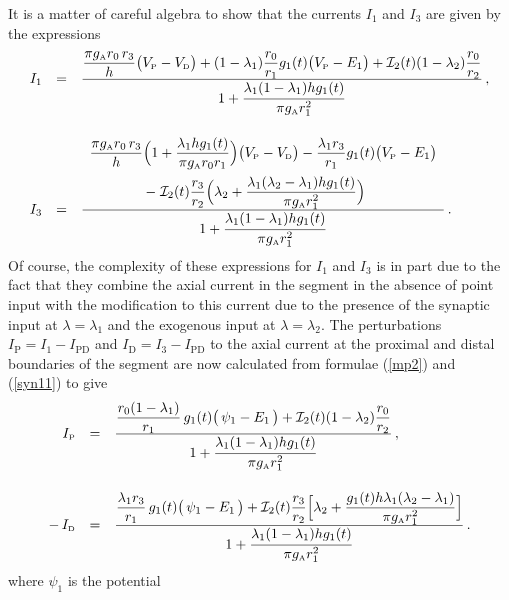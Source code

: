 It is a matter of careful algebra to show that the currents $I_1$
and $I_3$ are given by the expressions
\begin{equation}\label{syn11}
\begin{array}{rcl}
I_1 & = & \frac{\displaystyle\frac{\pi g_{\mbox{\tiny A}}r_0\,r_3}{h}
\big(V_{\mbox{\tiny P}}-V_{\mbox{\tiny D}}\big)
+(1-\lambda_1)\frac{r_0}{r_1}g_1(t)\big(V_{\mbox{\tiny P}}-E_1\big)
+\mathcal{I}_2(t)(1-\lambda_2)\frac{r_0}{r_2}}{\displaystyle1+
\frac{\lambda_1(1-\lambda_1)hg_1(t)\strut}{\pi
g_{\mbox{\tiny A}}r_1^2}}\,,\\[35pt]
I_3 & = & \frac{\begin{array}{l}
\displaystyle\frac{\pi g_{\mbox{\tiny A}}r_0\,r_3}{h} \Big(1+\frac{\lambda_1 h g_1(t)}
{\pi g_{\mbox{\tiny A}}r_0r_1}\Big) \big(V_{\mbox{\tiny P}}-V_{\mbox{\tiny D}}\big)
-\frac{\lambda_1 r_3}{r_1}g_1(t)\big(V_{\mbox{\tiny P}}-E_1\big)\\[10pt]
\qquad\qquad\displaystyle-\;\mathcal{I}_2(t)\frac{r_3}{r_2}\Big(\lambda_2
+\frac{\lambda_1(\lambda_2-\lambda_1) h g_1(t)}{\pi g_{\mbox{\tiny A}}
r_1^2}\Big)\end{array}}
{\displaystyle1+\frac{\lambda_1(1-\lambda_1)hg_1(t)\strut}{\pi g_{\mbox{\tiny A}}r_1^2}}\,.
\end{array}
\end{equation}
Of course, the complexity of these expressions for $I_1$ and $I_3$
is in part due to the fact that they combine the axial current in
the segment in the absence of point input with the modification to
this current due to the presence of the synaptic input at
$\lambda=\lambda_1$ and the exogenous input at
$\lambda=\lambda_2$. The perturbations
$I_\mathrm{P}=I_1-I_\mathrm{PD}$ and
$I_\mathrm{D}=I_3-I_\mathrm{PD}$ to the axial current at the
proximal and distal boundaries of the segment are now calculated
from formulae (\ref{mp2}) and (\ref{syn11}) to give
\begin{equation}\label{syn12}
\begin{array}{rcl}
I_{\mbox{\tiny P}} & = & \frac{\displaystyle\frac{r_0(1-\lambda_1)}{r_1}\,
g_1(t)\big(\,\psi_1-E_1\,\big)
+\mathcal{I}_2(t)(1-\lambda_2)\frac{r_0}{r_2}}{\displaystyle1+
\frac{\lambda_1(1-\lambda_1)hg_1(t)\strut}{\pi
g_{\mbox{\tiny A}}r_1^2}}\,,\\[35pt]
-\,I_{\mbox{\tiny D}} & = &
\frac{\displaystyle\frac{\lambda_1 r_3}{r_1}\,g_1(t)\big(\,\psi_1-E_1\,\big)
+\mathcal{I}_2(t)\frac{r_3}{r_2}\Big[\lambda_2+\frac{g_1(t)
h \lambda_1(\lambda_2-\lambda_1)}{\pi g_{\mbox{\tiny A}}r_1^2}\Big]}
{\displaystyle1+\frac{\lambda_1(1-\lambda_1)hg_1(t)\strut}{\pi
g_{\mbox{\tiny A}}r_1^2}}\,.
\end{array}
\end{equation}
where $\psi_1$ is the potential
